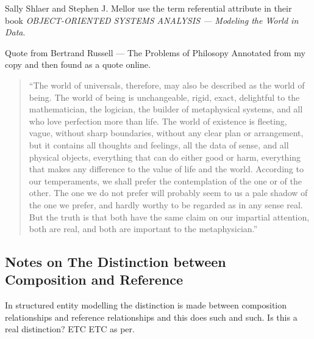 \begin{noteforfuture}
 Sally Shlaer and Stephen J. Mellor use the term referential attribute
in their book \textit{OBJECT-ORIENTED SYSTEMS ANALYSIS --- Modeling the World in Data}.
\end{noteforfuture}

Quote from Bertrand Russell --- The Problems of Philosopy Annotated from my copy and then found as a quote online.
\begin{quote}
“The world of universals, therefore, may also be described as the world of being. The world of being is unchangeable, rigid, exact, delightful to the mathematician, the logician, the builder of metaphysical systems, and all who love perfection more than life. The world of existence is fleeting, vague, without sharp boundaries, without any clear plan or arrangement, but it contains all thoughts and feelings, all the data of sense, and all physical objects, everything that can do either good or harm, everything that makes any difference to the value of life and the world. According to our temperaments, we shall prefer the contemplation of the one or of the other. The one we do not prefer will probably seem to us a pale shadow of the one we prefer, and hardly worthy to be regarded as in any sense real. But the truth is that both have the same claim on our impartial attention, both are real, and both are important to the metaphysician.”
\end{quote}

\subsection{Notes on The Distinction between Composition and Reference}
\begin{noteforfuture}
In structured entity modelling the distinction is made between composition relationships and reference relationships and this does such and such. Is this a real distinction? ETC ETC as per.
\end{noteforfuture}

